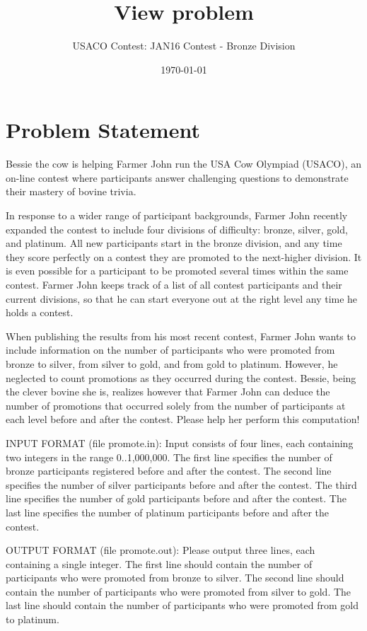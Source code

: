 \documentclass[12pt]{article}
\title{View problem}
\author{USACO Contest: JAN16 Contest - Bronze Division}
\date{\today}
\begin{document}
\maketitle

\section*{Problem Statement}

Bessie the cow is helping Farmer John run the USA Cow Olympiad (USACO), an
on-line contest where participants answer challenging questions to demonstrate
their mastery of bovine trivia.

In response to a wider range of participant backgrounds, Farmer John recently
expanded the contest to include four divisions of difficulty: bronze, silver,
gold, and platinum.  All new participants start in the bronze division, and any
time they score perfectly on a contest they are promoted to the next-higher
division.  It is even possible for a participant to be promoted several times
within the same contest. Farmer John keeps track of a list of all contest
participants and their current divisions, so that he can start everyone out at
the right level any time he holds a contest.

When publishing the results from his most recent contest, Farmer John wants to
include information on the number of participants who were promoted from bronze
to silver, from silver to gold, and from gold to platinum.  However, he
neglected to count promotions as they occurred during the contest.  Bessie,
being the clever bovine she is, realizes however that Farmer John can deduce the
number of promotions that occurred solely from the number of participants at
each level before and after the contest.  Please help her perform this
computation!

INPUT FORMAT (file promote.in):
Input consists of four lines, each containing two integers in the range
0..1,000,000. The first line specifies the number of bronze participants
registered before and after the contest. The second line specifies the number of
silver participants before and after the contest. The third line specifies the
number of gold participants before and after the contest. The last line
specifies the number of platinum participants before and after the contest.

OUTPUT FORMAT (file promote.out):
Please output three lines, each containing a single integer. The first line
should contain the number of participants who were promoted from bronze to
silver. The second line should contain the number of participants who were
promoted from silver to gold. The last line should contain the number of
participants who were promoted from gold to platinum.
\end{document}
